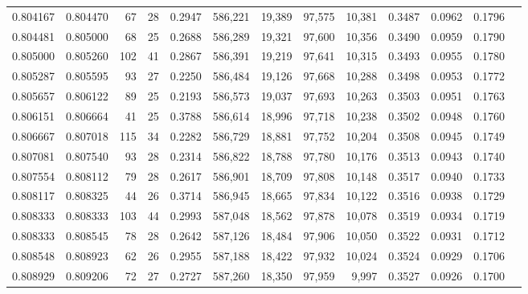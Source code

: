 \begin{tabular}{rrrrrrrrrrrrr}
0.804167 & 0.804470 &     67 &    28 &                                     0.2947 & 586,221 &  19,389 &  97,575 &  10,381 & 0.3487 & 0.0962 & 0.1796 \\
0.804481 & 0.805000 &     68 &    25 &                                     0.2688 & 586,289 &  19,321 &  97,600 &  10,356 & 0.3490 & 0.0959 & 0.1790 \\
0.805000 & 0.805260 &    102 &    41 &                                     0.2867 & 586,391 &  19,219 &  97,641 &  10,315 & 0.3493 & 0.0955 & 0.1780 \\
0.805287 & 0.805595 &     93 &    27 &                                     0.2250 & 586,484 &  19,126 &  97,668 &  10,288 & 0.3498 & 0.0953 & 0.1772 \\
0.805657 & 0.806122 &     89 &    25 &                                     0.2193 & 586,573 &  19,037 &  97,693 &  10,263 & 0.3503 & 0.0951 & 0.1763 \\
0.806151 & 0.806664 &     41 &    25 &                                     0.3788 & 586,614 &  18,996 &  97,718 &  10,238 & 0.3502 & 0.0948 & 0.1760 \\
0.806667 & 0.807018 &    115 &    34 &                                     0.2282 & 586,729 &  18,881 &  97,752 &  10,204 & 0.3508 & 0.0945 & 0.1749 \\
0.807081 & 0.807540 &     93 &    28 &                                     0.2314 & 586,822 &  18,788 &  97,780 &  10,176 & 0.3513 & 0.0943 & 0.1740 \\
0.807554 & 0.808112 &     79 &    28 &                                     0.2617 & 586,901 &  18,709 &  97,808 &  10,148 & 0.3517 & 0.0940 & 0.1733 \\
0.808117 & 0.808325 &     44 &    26 &                                     0.3714 & 586,945 &  18,665 &  97,834 &  10,122 & 0.3516 & 0.0938 & 0.1729 \\
0.808333 & 0.808333 &    103 &    44 &                                     0.2993 & 587,048 &  18,562 &  97,878 &  10,078 & 0.3519 & 0.0934 & 0.1719 \\
0.808333 & 0.808545 &     78 &    28 &                                     0.2642 & 587,126 &  18,484 &  97,906 &  10,050 & 0.3522 & 0.0931 & 0.1712 \\
0.808548 & 0.808923 &     62 &    26 &                                     0.2955 & 587,188 &  18,422 &  97,932 &  10,024 & 0.3524 & 0.0929 & 0.1706 \\
0.808929 & 0.809206 &     72 &    27 &                                     0.2727 & 587,260 &  18,350 &  97,959 &   9,997 & 0.3527 & 0.0926 & 0.1700 \\

\end{tabular}
